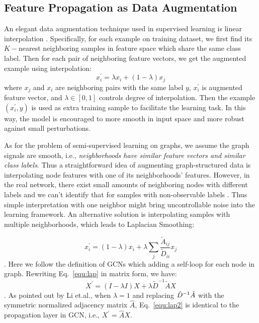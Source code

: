 {{\subsection{Feature Propagation as Data Augmentation}
\label{sec:aug}
An elegant data augmentation technique used in supervised learning is linear interpolation \cite{devries2017dataset}. Specifically, for each example on training dataset, we first find its $K-$nearest neighboring samples in feature space which share the same class label. Then for each pair of neighboring feature vectors, we get the augmented example using interpolation:
\begin{equation}
    x^{'}_i = \lambda x_i + (1-\lambda)x_j
\end{equation}
where $x_j$ and $x_i$ are neighboring pairs with the same label $y$, $x^{'}_i$ is augmented feature vector, and $\lambda \in [0,1]$ controls degree of interpolation\reminder{}. Then the example $(x^{'}_i, y)$ is used as extra training sample to facilitate the learning task. In this way, the model is encouraged to more smooth in input space and more robust against small perturbations. 


As for the problem of semi-supervised learning on graphs, we assume the graph signals are smooth, i.e., \textit{neighborhoods have similar feature vectors and similar class labels}. Thus a straightforward idea of augmenting graph-structured data is interpolating node features with one of its neighborhoods' features. However, in the real network, there exist small amounts of neighboring nodes with different labels and we can't identify that for samples with non-observable labels . Thus simple interpretation with one neighbor might bring uncontrollable noise into the learning framework. 
An alternative solution is interpolating samples with multiple neighborhoods, which leads to Laplacian Smoothing:

\begin{equation}
\label{equ:lap}
x^{'}_i = (1-\lambda) x_i + \lambda \sum_j \frac{\widetilde{A}_{ij}}{\widetilde{D}_{ii}} x_j
\end{equation}.
Here we follow the definition of GCNs which adding a self-loop for each node in graph\reminder{}. Rewriting Eq.~\ref{equ:lap} in matrix form, we have:
\begin{equation}
\label{equ:lap2}
    X^{'}=  (I-\lambda I)X + \lambda \widetilde{D}^{-1} \widetilde{A}X
\end{equation}.
As pointed out by Li et.al.\cite{li2018deeper}\reminder{}, when $\lambda = 1$ and replacing $\Tilde{D}^{-1} \Tilde{A}$ with the symmetric normalized adjacency matrix $\hat{A}$, Eq.~\ref{equ:lap2} is identical to the propagation layer in GCN, i.e., $X^{'}= \hat{A}X$.

}}
